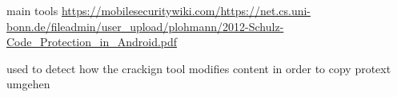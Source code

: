 main tools\newline
\url{https://mobilesecuritywiki.com/}\newline \url{https://net.cs.uni-bonn.de/fileadmin/user_upload/plohmann/2012-Schulz-Code_Protection_in_Android.pdf}\newline

used to detect how the crackign tool modifies content in order to copy protext umgehen\newline
